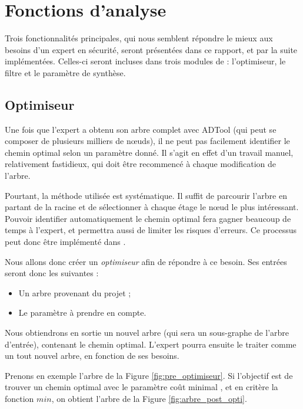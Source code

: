 \section{Fonctions d'analyse}

	
	
	Trois fonctionnalités principales, qui nous semblent répondre le mieux aux besoins d'un expert en sécurité, seront présentées dans ce rapport, et par la suite implémentées. Celles-ci seront incluses dans trois modules de \glasir{} : l'optimiseur, le filtre et le paramètre de synthèse.

	\subsection{Optimiseur}
		\label{subsection:optimiseur}

		Une fois que l'expert a obtenu son arbre complet avec ADTool (qui peut se composer de plusieurs milliers de nœuds), il ne peut pas facilement identifier le chemin optimal selon un paramètre donné. Il s'agit en effet d'un travail manuel, relativement fastidieux, qui doit être recommencé à chaque modification de l'arbre.
		
		Pourtant, la méthode utilisée est systématique. Il suffit de parcourir l'arbre en partant de la racine et de sélectionner à chaque étage le nœud le plus intéressant. Pouvoir identifier automatiquement le chemin optimal fera gagner beaucoup de temps à l'expert, et permettra aussi de limiter les risques d'erreurs. Ce processus peut donc être implémenté dans \glasir{}. 

		Nous allons donc créer un \textit{optimiseur} afin de répondre à ce besoin.
		Ses entrées seront donc les suivantes :
		\begin{itemize}
			\item Un arbre provenant du projet ;
			\item Le paramètre à prendre en compte.
		\end{itemize}
		Nous obtiendrons en sortie un nouvel arbre (qui sera un sous-graphe de l'arbre d'entrée), contenant le chemin optimal. L'expert pourra ensuite le traiter comme un tout nouvel arbre, en fonction de ses besoins.
		
		Prenons en exemple l'arbre de la {\sc Figure} \ref{fig:pre_optimiseur}. Si l'objectif est de trouver un chemin optimal avec le paramètre \og coût minimal \fg{}, et en critère la fonction $min$, on obtient l'arbre de la {\sc Figure} \ref{fig:arbre_post_opti}.
		
